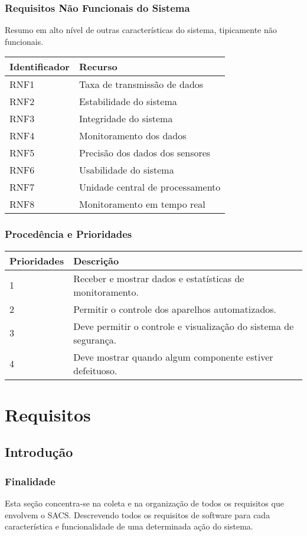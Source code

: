 \subsubsection{Requisitos Não Funcionais do Sistema}

	Resumo em alto nível de outras características do sistema, tipicamente não funcionais.

\begin{tabular}{|l|l|}
\hline
\textbf{Identificador} & \textbf{Recurso}\tabularnewline
\hline
\hline
RNF1 & Taxa de transmissão de dados\tabularnewline
\hline
RNF2 & Estabilidade do sistema\tabularnewline
\hline
RNF3 & Integridade do sistema\tabularnewline
\hline
RNF4 & Monitoramento dos dados\tabularnewline
\hline
RNF5 & Precisão dos dados dos sensores\tabularnewline
\hline
RNF6 & Usabilidade do sistema\tabularnewline
\hline
RNF7 & Unidade central de processamento\tabularnewline
\hline
RNF8 & Monitoramento em tempo real\tabularnewline
\hline
\end{tabular}

\subsubsection{Procedência e Prioridades}

\begin{tabular}{|l|l|}
\hline
\textbf{Prioridades} & \textbf{Descrição}\tabularnewline
\hline
\hline
1 & Receber e mostrar dados e estatísticas de monitoramento. \tabularnewline
\hline
2 & Permitir o controle dos aparelhos automatizados. \tabularnewline
\hline
3 & Deve permitir o controle e visualização do sistema de segurança. \tabularnewline
\hline
4 & Deve mostrar quando algum componente estiver defeituoso. \tabularnewline
\hline
\end{tabular}

\section{Requisitos}

\subsection{Introdução}
\subsubsection{Finalidade}
	Esta seção concentra-se na coleta e na organização de todos os requisitos que envolvem o SACS. Descrevendo todos
	os requisitos de software para cada característica e funcionalidade de uma determinada ação do sistema.


